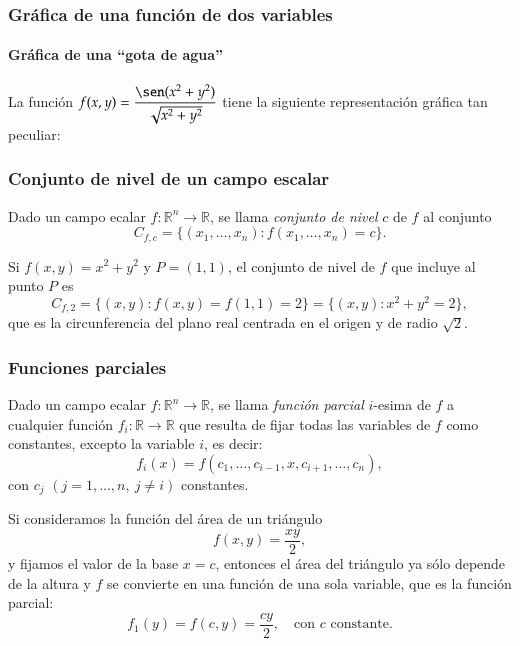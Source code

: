 \begin{frame}
	\frametitle{Gráfica de una función de dos variables}
	\framesubtitle{Gráfica de una ``gota de agua''}
	La función $\displaystyle f(x,y)=\frac{\sen(x^2+y^2)}{\sqrt{x^2+y^2}}$ tiene la siguiente representación gráfica tan
	peculiar:
	\begin{center}
		\scalebox{1}{}
	\end{center}
\end{frame}


\begin{frame}
	\frametitle{Conjunto de nivel de un campo escalar}
	\begin{definicion}
		Dado un campo ecalar $f:\mathbb{R}^n\rightarrow \mathbb{R}$, se llama \emph{conjunto de nivel} $c$ de $f$ al conjunto
		\[
			C_{f,c}=\{(x_1,\ldots,x_n): f(x_1,\ldots,x_n)=c\}.
		\]
	\end{definicion}
	Si $f(x,y)=x^2+y^2$ y $P=(1,1)$, el conjunto de nivel de $f$ que incluye al punto $P$ es
	\[
		C_{f,2} = \{(x,y): f(x,y)=f(1,1)=2\} = \{(x,y): x^2+y^2=2\},
	\] 
	que es la circunferencia del plano real centrada en el origen y de radio $\sqrt{2}$.
	\begin{center}
		\scalebox{0.8}{}
	\end{center}
\end{frame}


\begin{frame}
	\frametitle{Funciones parciales}
	\begin{definicion}
		Dado un campo ecalar $f:\mathbb{R}^n\rightarrow \mathbb{R}$, se llama \emph{función parcial} $i$-esima de $f$ a
		cualquier función $f_i:\mathbb{R}\rightarrow \mathbb{R}$ que resulta de fijar todas las variables de $f$ como
		constantes, excepto la variable $i$, es decir:
		\[
			f_i(x)=f(c_1,\ldots,c_{i-1},x,c_{i+1},\ldots,c_{n}),
		\]
		con $c_j$ $(j=1,\ldots, n,\ j\neq i)$ constantes. 
	\end{definicion}
	 
	Si consideramos la función del área de un triángulo 
	\[f(x,y)=\frac{xy}{2},\]
	y fijamos el valor de la base $x=c$, entonces el área del triángulo ya sólo depende de la altura y $f$ se convierte en
	una función de una sola variable, que es la función parcial:
	\[
		f_1(y)=f(c,y)=\frac{cy}{2},\quad \mbox{con $c$ constante}.
	\]
\end{frame}



